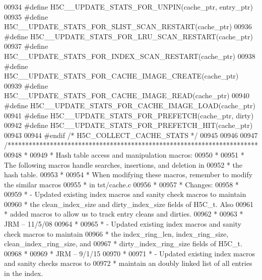 \begin{DoxyCode}
00934 \textcolor{preprocessor}{#define H5C\_\_UPDATE\_STATS\_FOR\_UNPIN(cache\_ptr, entry\_ptr)}
00935 \textcolor{preprocessor}{#define H5C\_\_UPDATE\_STATS\_FOR\_SLIST\_SCAN\_RESTART(cache\_ptr)}
00936 \textcolor{preprocessor}{#define H5C\_\_UPDATE\_STATS\_FOR\_LRU\_SCAN\_RESTART(cache\_ptr)}
00937 \textcolor{preprocessor}{#define H5C\_\_UPDATE\_STATS\_FOR\_INDEX\_SCAN\_RESTART(cache\_ptr)}
00938 \textcolor{preprocessor}{#define H5C\_\_UPDATE\_STATS\_FOR\_CACHE\_IMAGE\_CREATE(cache\_ptr)}
00939 \textcolor{preprocessor}{#define H5C\_\_UPDATE\_STATS\_FOR\_CACHE\_IMAGE\_READ(cache\_ptr)}
00940 \textcolor{preprocessor}{#define H5C\_\_UPDATE\_STATS\_FOR\_CACHE\_IMAGE\_LOAD(cache\_ptr)}
00941 \textcolor{preprocessor}{#define H5C\_\_UPDATE\_STATS\_FOR\_PREFETCH(cache\_ptr, dirty)}
00942 \textcolor{preprocessor}{#define H5C\_\_UPDATE\_STATS\_FOR\_PREFETCH\_HIT(cache\_ptr)}
00943 
00944 \textcolor{preprocessor}{#endif }\textcolor{comment}{/* H5C\_COLLECT\_CACHE\_STATS */}\textcolor{preprocessor}{}
00945 
00946 
00947 \textcolor{comment}{/***********************************************************************}
00948 \textcolor{comment}{ *}
00949 \textcolor{comment}{ * Hash table access and manipulation macros:}
00950 \textcolor{comment}{ *}
00951 \textcolor{comment}{ * The following macros handle searches, insertions, and deletion in}
00952 \textcolor{comment}{ * the hash table.}
00953 \textcolor{comment}{ *}
00954 \textcolor{comment}{ * When modifying these macros, remember to modify the similar macros}
00955 \textcolor{comment}{ * in tst/cache.c}
00956 \textcolor{comment}{ *}
00957 \textcolor{comment}{ * Changes:}
00958 \textcolor{comment}{ *}
00959 \textcolor{comment}{ *   - Updated existing index macros and sanity check macros to maintain}
00960 \textcolor{comment}{ *     the clean\_index\_size and dirty\_index\_size fields of H5C\_t.  Also}
00961 \textcolor{comment}{ *     added macros to allow us to track entry cleans and dirties.}
00962 \textcolor{comment}{ *}
00963 \textcolor{comment}{ *                          JRM -- 11/5/08}
00964 \textcolor{comment}{ *}
00965 \textcolor{comment}{ *   - Updated existing index macros and sanity check macros to maintain }
00966 \textcolor{comment}{ *     the index\_ring\_len, index\_ring\_size, clean\_index\_ring\_size, and}
00967 \textcolor{comment}{ *     dirty\_index\_ring\_size fields of H5C\_t.}
00968 \textcolor{comment}{ *}
00969 \textcolor{comment}{ *                      JRM -- 9/1/15}
00970 \textcolor{comment}{ *}
00971 \textcolor{comment}{ *   - Updated existing index macros and sanity checks macros to }
00972 \textcolor{comment}{ *     maintain an doubly linked list of all entries in the index.}

\end{DoxyCode}
